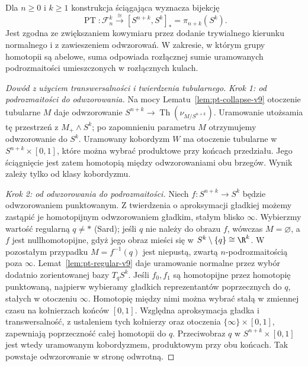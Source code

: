 \begin{twierdzenie}
\label{thm:pt-framed-v9}
Dla $n\ge0$ i $k\ge1$ konstrukcja ściągająca
wyznacza bijekcję
\[
\operatorname{PT}:\mathcal F_n^k\xrightarrow{\cong}
[S^{n+k},S^k]_*=\pi_{n+k}(S^k).
\]
Jest zgodna ze zwiększaniem kowymiaru przez dodanie
trywialnego kierunku normalnego i z zawieszeniem
odwzorowań. W zakresie, w którym grupy homotopii
są abelowe, suma odpowiada rozłącznej sumie
uramowanych podrozmaitości umieszczonych w rozłącznych
kulach.
\end{twierdzenie}
\begin{proof}[Dowód z użyciem transwersalności i twierdzenia tubularnego]
\emph{Krok 1: od podrozmaitości do odwzorowania.}
Na mocy Lematu~\ref{lem:pt-collapse-v9} otoczenie tubularne
$M$ daje odwzorowanie $S^{n+k}\to\operatorname{Th}(\nu_{M/S^{n+k}})$.
Uramowanie utożsamia tę przestrzeń z $M_+\wedge S^k$;
po zapomnieniu parametru $M$ otrzymujemy odwzorowanie do $S^k$.
Uramowany kobordyzm $W$ ma otoczenie tubularne w
$S^{n+k}\times[0,1]$, które można wybrać produktowe
przy końcach przedziału. Jego ściągnięcie jest zatem
homotopią między odwzorowaniami obu brzegów.
Wynik zależy tylko od klasy kobordyzmu.

\emph{Krok 2: od odwzorowania do podrozmaitości.}
Niech $f:S^{n+k}\to S^k$ będzie odwzorowaniem
punktowanym. Z twierdzenia o aproksymacji gładkiej
możemy zastąpić je homotopijnym odwzorowaniem gładkim,
stałym blisko $\infty$. Wybierzmy wartość regularną
$q\ne*$ (Sard); jeśli $q$ nie należy do obrazu $f$,
wówczas $M=\varnothing$, a $f$ jest nullhomotopijne, gdyż
jego obraz mieści się w $S^k\setminus\{q\}\cong\R^k$.
W pozostałym przypadku $M=f^{-1}(q)$ jest niepustą, zwartą
$n$-podrozmaitością poza $\infty$.
Lemat~\ref{lem:pt-regular-v9} daje uramowanie normalne
przez wybór dodatnio zorientowanej bazy $T_qS^k$.
Jeśli $f_0,f_1$ są homotopijne przez homotopię punktowaną,
najpierw wybieramy gładkich reprezentantów
poprzecznych do $q$, stałych w otoczeniu $\infty$.
Homotopię między nimi można wybrać stałą
w zmiennej czasu na kołnierzach końców $[0,1]$.
Względna aproksymacja gładka i transwersalność,
z ustaleniem tych kołnierzy oraz otoczenia
$\{\infty\}\times[0,1]$, zapewniają
poprzeczność całej homotopii do $q$.
Przeciwobraz $q$ w $S^{n+k}\times[0,1]$
jest wtedy uramowanym kobordyzmem,
produktowym przy obu końcach.
Tak powstaje odwzorowanie w stronę odwrotną.


\end{proof}
